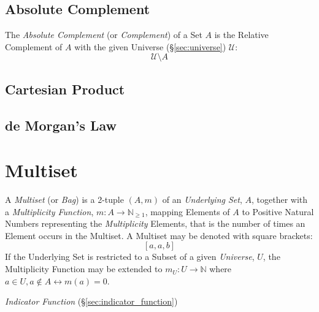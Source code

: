 \subsection{Absolute Complement}\label{sec:absolute_complement}

The \emph{Absolute Complement} (or \emph{Complement}) of a Set $A$ is
the Relative Complement of $A$ with the given Universe
(\S\ref{sec:universe}) $\mathcal{U}$:
\[
  \mathcal{U} \setminus A
\]



\subsection{Cartesian Product}\label{sec:cartesian_product}

\subsection{de Morgan's Law}\label{sec:de_morgan}



\section{Multiset}\label{sec:multiset}

A \emph{Multiset} (or \emph{Bag}) is a 2-tuple $(A,m)$ of an
\emph{Underlying Set}, $A$, together with a \emph{Multiplicity
  Function}, $m : A \rightarrow \mathbb{N}_{\geq 1}$, mapping Elements
of $A$ to Positive Natural Numbers representing the
\emph{Multiplicity} Elements, that is the number of times an Element
occurs in the Multiset. A Multiset may be denoted with square
brackets:
\[
  [a,a,b]
\]
If the Underlying Set is restricted to a Subset of a given
\emph{Universe}, $U$, the Multiplicity Function may be extended to
$m_U : U \rightarrow \mathbb{N}$ where $a \in U, a \notin A
\leftrightarrow m(a)=0$.

\emph{Indicator Function} (\S\ref{sec:indicator_function})



